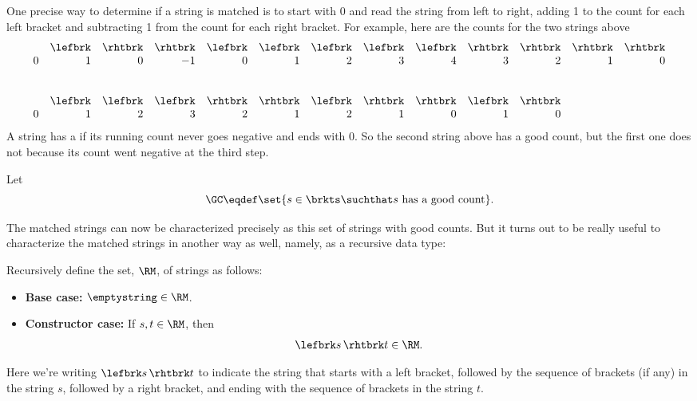 One precise way to determine if a string is matched is to start with 0 and
read the string from left to right, adding 1 to the count for each left
bracket and subtracting 1 from the count for each right bracket.
For example, here are the counts for the two strings above
\[\begin{array}{rrrrrrrrrrrrr}
& \lefbrk & \rhtbrk & \rhtbrk & \lefbrk & \lefbrk & \lefbrk & \lefbrk &
\lefbrk & \rhtbrk & \rhtbrk & \rhtbrk & \rhtbrk\\
0 & 1 & 0 & -1 & 0 & 1 & 2 & 3 & 4 & 3 & 2 & 1 & 0\\
\\
\\
& \lefbrk & \lefbrk & \lefbrk & \rhtbrk & \rhtbrk & \lefbrk & \rhtbrk &
\rhtbrk & \lefbrk & \rhtbrk\\
0 & 1 & 2 & 3 & 2 & 1 & 2 & 1 & 0 & 1 & 0
\end{array}\]
A string has a  if its running count never goes
negative and ends with 0.  So the second string above has a good count, but
the first one does not because its count went negative at the third step.
\begin{definition}\label{gc-def}
Let
\[
\GC \eqdef \set{ s \in \brkts \suchthat s\ \text{has a good count}}.
\]
\end{definition}
The matched strings can now be characterized precisely as this set of
strings with good counts.  But it turns out to be really useful to
characterize the matched strings in another way as well, namely, as a
recursive data type:

\begin{definition}\label{RM-def}
Recursively define the set, $\RM$, of strings as follows:
\begin{itemize}

\item \textbf{Base case:} $\emptystring \in\RM$.

\item \textbf{Constructor case:} If $s,t \in\RM$, then
\[
\lefbrk s\, \rhtbrk t \in\RM.
\]

\end{itemize}

\end{definition}

Here we're writing $\lefbrk s\, \rhtbrk t$ to indicate the string that
starts with a left bracket, followed by the sequence of brackets
(if any) in the string $s$, followed by a right bracket, and ending
with the sequence of brackets in the string $t$.

